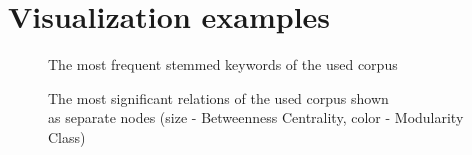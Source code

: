 \documentclass[]{article}
\begin{document}
\renewcommand\thefigure{\thesection.\arabic{figure}} 

%
\section{Visualization examples}
%
\setcounter{figure}{0}

\begin{figure}[htbp]
  \centering
    \caption{The most frequent stemmed keywords of the used corpus}
  \label{Cloud}
\end{figure}
\begin{figure}[htbp]
  \centering
    \captionsetup{justification=centering}
    \caption{The most significant relations of the used corpus shown \\ as separate nodes (size - Betweenness Centrality, color - Modularity Class)}
  \label{AllRelations}
\end{figure}
\end{document}
